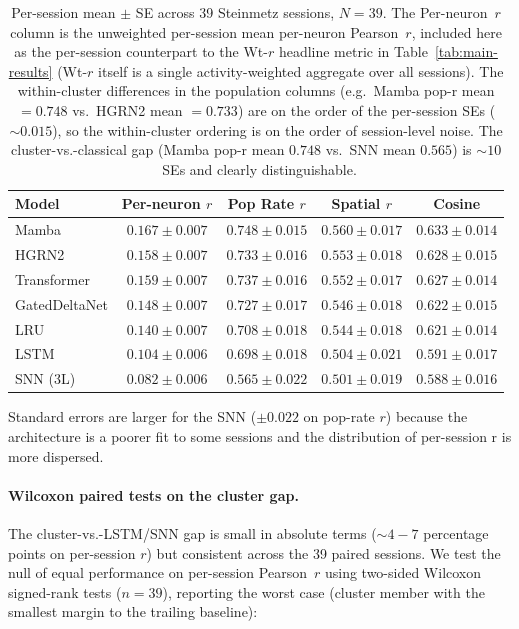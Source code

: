 \documentclass{article}
\begin{document}
\begin{table}[h]
  \caption{Per-session mean $\pm$ SE across 39 Steinmetz sessions, $N{=}39$.
    The Per-neuron~$r$ column is the unweighted per-session mean per-neuron
    Pearson~$r$, included here as the per-session counterpart to the Wt-$r$
    headline metric in Table~\ref{tab:main-results} (Wt-$r$ itself is a
    single activity-weighted aggregate over all sessions).
    The within-cluster differences in the population columns
    (e.g.\ Mamba pop-r mean ${=}0.748$ vs.\ HGRN2 mean ${=}0.733$) are on
    the order of the per-session SEs (${\sim}0.015$), so the within-cluster
    ordering is on the order of session-level noise.  The
    cluster-vs.-classical gap (Mamba pop-r mean $0.748$ vs.\ SNN
    mean $0.565$) is ${\sim}10$~SEs and clearly distinguishable.}
  \label{tab:per-session-se}
  \centering
  \small
  \begin{tabular}{@{} l c c c c @{}}
    \toprule
    \textbf{Model} & \textbf{Per-neuron $r$} & \textbf{Pop Rate $r$}
      & \textbf{Spatial $r$} & \textbf{Cosine} \\
    \midrule
    Mamba         & $0.167\pm0.007$ & $0.748\pm0.015$ & $0.560\pm0.017$ & $0.633\pm0.014$ \\
    HGRN2         & $0.158\pm0.007$ & $0.733\pm0.016$ & $0.553\pm0.018$ & $0.628\pm0.015$ \\
    Transformer   & $0.159\pm0.007$ & $0.737\pm0.016$ & $0.552\pm0.017$ & $0.627\pm0.014$ \\
    GatedDeltaNet & $0.148\pm0.007$ & $0.727\pm0.017$ & $0.546\pm0.018$ & $0.622\pm0.015$ \\
    LRU        & $0.140\pm0.007$ & $0.708\pm0.018$ & $0.544\pm0.018$ & $0.621\pm0.014$ \\
    LSTM          & $0.104\pm0.006$ & $0.698\pm0.018$ & $0.504\pm0.021$ & $0.591\pm0.017$ \\
    SNN (3L)      & $0.082\pm0.006$ & $0.565\pm0.022$ & $0.501\pm0.019$ & $0.588\pm0.016$ \\
    \bottomrule
  \end{tabular}
\end{table}

Standard errors are larger for the SNN ($\pm 0.022$ on pop-rate $r$)
because the architecture is a poorer fit to some sessions and the
distribution of per-session r is more dispersed.

\paragraph{Wilcoxon paired tests on the cluster gap.}
The cluster-vs.-LSTM/SNN gap is small in absolute terms
(${\sim}4{-}7$ percentage points on per-session $r$) but consistent
across the 39 paired sessions.  We test the null of equal performance
on per-session Pearson~$r$ using two-sided Wilcoxon signed-rank tests
($n{=}39$), reporting the worst case (cluster member with the smallest
margin to the trailing baseline):
\end{document}
